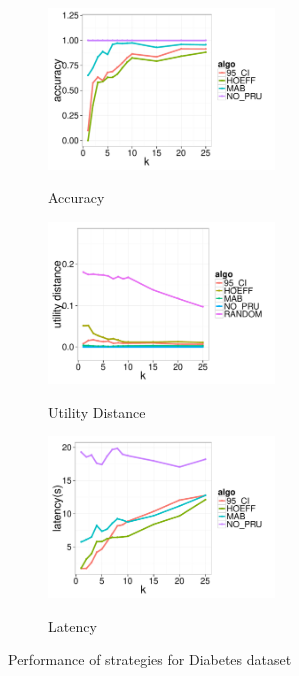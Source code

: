 \begin{figure}[t]
	\centering
	\begin{subfigure}{0.33\linewidth}
		\centering
		{\includegraphics[width=6cm] {Images/in_memory_dia_accuracy.pdf}}
		\caption{Accuracy}
		\label{fig:dia_accuracy}
	\end{subfigure}
	\begin{subfigure}{0.33\linewidth}
		\centering
		{\includegraphics[width=6cm] {Images/in_memory_dia_utility_dist.pdf}}
		\caption{Utility Distance}
		\label{fig:dia_utility_dist}
	\end{subfigure}
	\begin{subfigure}{0.33\linewidth}
		\centering
		{\includegraphics[width=6cm] {Images/in_memory_dia_latency.pdf}}
		\caption{Latency}
		\label{fig:diabetes_latency}
	\end{subfigure}
	\vspace{-10pt}
	\caption{Performance of strategies for Diabetes dataset}
	\label{fig:diabetes_perf}
	\vspace{-10pt}
\end{figure}



